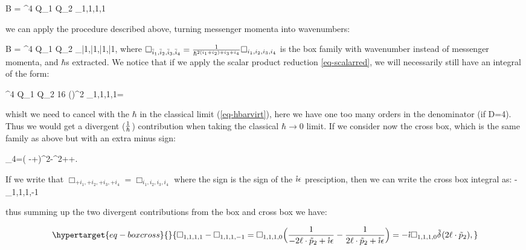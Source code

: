 \documentclass[
  10pt,
  a4paper,
  DIV=11,
  numbers=noendperiod,
  twoside]{scrreprt}
\let\[\relax \let\]\relax %
\DeclareRobustCommand{\[}{\begin{equation}}
\DeclareRobustCommand{\]}{\end{equation}}
\begin{document}
\[
\im B = \elch^4 Q_{1} Q_{2} \int \dn[D]{\ell} \Box_{1,1,1,1}
\]

we can apply the procedure described above, turning messenger momenta
into wavenumbers:

\[
\im B = \elch^4 Q_{1} Q_{2} \int \dn[D]{\bar{\ell}} \Box_{\bar{1},\bar{1},\bar{1},\bar{1}},
\] where
\(\Box_{\bar{i}_1,\bar{i}_2,\bar{i}_3,\bar{i}_4} =\frac{1}{\hbar^{2(i_1+i_2)+i_3+i_4}} \Box_{i_1,i_2,i_3,i_4}\)
is the box family with wavenumber instead of messenger momenta, and
\(\hbar\)s extracted. We notice that if we apply the scalar product
reduction \ref{eq-scalarred}, we will necessarily still have an integral
of the form:

\[
\elch^4 Q_{1} Q_{2} 16 (\semom[1]\cdot \semom[2])^2 \int \dn[D]{{\ell}}\Box_{1,1,1,1}=\order[D-6]{\hbar}
\]

whislt we need to cancel with the \(\hbar\) in the classical limit
(\ref{eq-hbarvirt}), here we have one too many orders in the denominator
(if D=4). Thus we would get a divergent (\(\frac{1}{\hbar}\)) contribution
when taking the classical \(\hbar\to 0\) limit. If we consider now the
cross box, which is the same family as above but with an extra minus
sign:

\[
\tilde{\rho}_4=( \Half[q] -\ell+\semom[2])^2-\mass[2]^2+\im \epsilon{}\ell\cdot\semom[2]+\im \epsilon.
\]

If we write that \(\Box_{+i_1,+i_2,+i_3,+i_4}=\Box_{i_1,i_2,i_3,i_4}\)
where the sign is the sign of the \(\mathring{\imath}\epsilon\) presciption, then we
can write the cross box integral as: \[
\int \dn[D]{\ell} -\Box_{1,1,1,-1}
\]

thus summing up the two divergent contributions from the box and cross
box we have:

\begin{equation}\protect\hypertarget{eq-boxcross}{}{
\Box_{1,1,1,1}-\Box_{1,1,1,-1}=\Box_{1,1,1,0}\pa[\Big]{\inv{-2\ell\cdot\semom[2]+\im \epsilon}-\inv{    2\ell\cdot\semom[2]+\im \epsilon}}=-\im\Box_{1,1,1,0}\ndeltafn{2\ell\cdot\semom[2]},
}\label{eq-boxcross}\end{equation}
\end{document}
